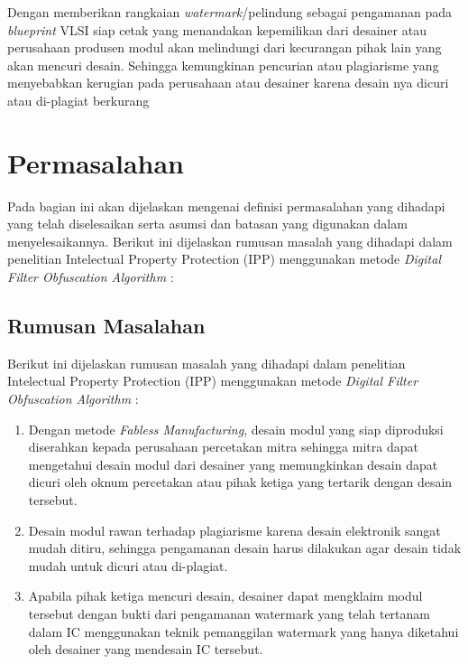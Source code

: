 Dengan memberikan rangkaian \textit{watermark}/pelindung sebagai pengamanan pada \textit{blueprint} VLSI siap cetak yang menandakan kepemilikan dari desainer atau perusahaan produsen modul akan melindungi dari kecurangan pihak lain yang akan mencuri desain. Sehingga kemungkinan pencurian atau plagiarisme yang menyebabkan kerugian pada perusahaan atau desainer karena desain nya dicuri atau di-plagiat berkurang

% 

\section{Permasalahan}
Pada bagian ini akan dijelaskan mengenai definisi permasalahan yang dihadapi yang telah diselesaikan serta asumsi dan batasan yang digunakan dalam menyelesaikannya. Berikut ini dijelaskan rumusan masalah yang dihadapi dalam penelitian Intelectual Property Protection (IPP) menggunakan metode \textit{Digital Filter Obfuscation Algorithm} :


\subsection{Rumusan Masalahan}
Berikut ini dijelaskan rumusan masalah yang dihadapi dalam penelitian Intelectual Property Protection (IPP) menggunakan metode \textit{Digital Filter Obfuscation Algorithm} :

\begin{enumerate}
	\item Dengan metode \textit{Fabless Manufacturing}, desain modul yang siap diproduksi diserahkan kepada perusahaan percetakan mitra sehingga mitra dapat mengetahui desain modul dari desainer yang	memungkinkan desain dapat dicuri oleh oknum percetakan atau pihak	ketiga yang tertarik dengan desain tersebut.
	
	\item Desain modul rawan terhadap plagiarisme karena desain elektronik sangat mudah ditiru, sehingga pengamanan desain harus dilakukan agar desain tidak mudah untuk dicuri atau di-plagiat.
	
	\item Apabila pihak ketiga mencuri desain, desainer dapat mengklaim modul tersebut dengan bukti dari pengamanan watermark yang telah tertanam dalam IC menggunakan teknik pemanggilan watermark yang hanya diketahui oleh desainer yang mendesain IC tersebut.
\end{enumerate}

